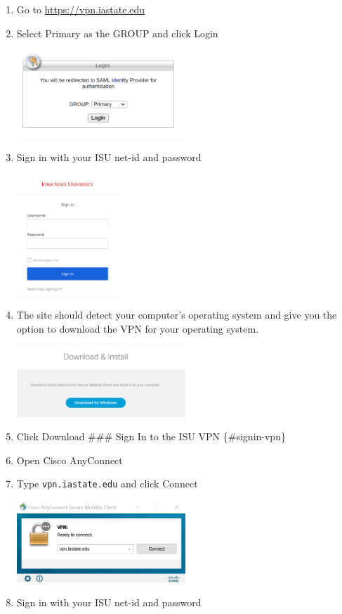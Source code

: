 \documentclass[
]{book}
\begin{document}
\begin{enumerate}
\def\labelenumi{\arabic{enumi}.}
\item
  Go to \url{https://vpn.iastate.edu}
\item
  Select Primary as the GROUP and click Login

  \includegraphics[width=0.5\textwidth,height=0.5\textheight]{images/group_primary.png}
\item
  Sign in with your ISU net-id and password

  \includegraphics[width=0.3\textwidth,height=0.3\textheight]{images/isu_login.png}
\item
  The site should detect your computer's operating system and give you the option to download the VPN for your operating system.

  \includegraphics[width=0.5\textwidth,height=0.5\textheight]{images/cisco_detect_os.png}
\item
  Click Download
  \#\#\# Sign In to the ISU VPN \{\#signin-vpn\}
\item
  Open Cisco AnyConnect
\item
  Type \texttt{vpn.iastate.edu} and click Connect

  \includegraphics[width=0.5\textwidth,height=0.5\textheight]{images/cisco.png}
\item
  Sign in with your ISU net-id and password


\end{enumerate}
\end{document}
